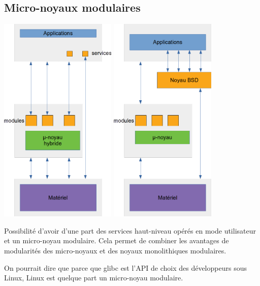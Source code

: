 \subsection{Micro-noyaux modulaires}
\begin{center}
  \includegraphics[height=10cm]{cours1/pics/cours1_micromod.png}
  \includegraphics[height=10cm]{cours1/pics/cours1_mach.png}
\end{center}
Possibilité d'avoir d'une part des services haut-niveau opérés en mode utilisateur
et un micro-noyau modulaire. Cela permet de combiner les avantages de modularités
des micro-noyaux et des noyaux monolithiques modulaires.

On pourrait dire que parce que glibc est l'API de choix des développeurs sous
Linux, Linux est quelque part un micro-noyau modulaire.

